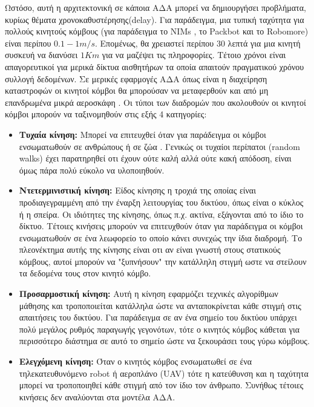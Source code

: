 Ωστόσο, αυτή η αρχιτεκτονική σε κάποια ΑΔΑ μπορεί να δημιουργήσει προβλήματα, κυρίως θέματα χρονοκαθυστέρησης(delay). Για παράδειγμα, μια τυπική ταχύτητα για πολλούς
κινητούς κόμβους (για παράδειγμα το NIMs \cite{nims_mobile}, το Packbot\cite{dynamic_deadlines} και το Robomore\cite{robomore_mobile}) είναι περίπου $0.1-1m/s$.
Επομένως, θα χρειαστεί περίπου 30 λεπτά για μια κινητή συσκευή να διανύσει $1Km$ για να μαζέψει τις πληροφορίες. Τέτοιο χρόνοι είναι απαγορευτικοί για μερικά δίκτυα
αισθητήρων τα οποία απαιτούν πραγματικού χρόνου συλλογή δεδομένων. Σε μερικές εφαρμογές ΑΔΑ όπως είναι η διαχείρηση καταστροφών οι κινητοί κόμβοι θα μπορούσαν να
μεταφερθούν και από μη επανδρωμένα μικρά αεροσκάφη \cite{uav_mobile}. Οι τύποι των διαδρομών που ακολουθούν οι κινητοί κόμβοι μπορούν να ταξινομηθούν στις εξής 4
κατηγορίες:

\begin{itemize}
\item \textbf{Τυχαία κίνηση:} Μπορεί να επιτευχθεί όταν για παράδειγμα οι κόμβοι ενσωματωθούν σε ανθρώπους ή σε ζώα \cite{zebranet}. Γενικώς οι τυχαίοι περίπατοι
(random walks) έχει παρατηρηθεί οτι έχουν ούτε καλή αλλά ούτε κακή απόδοση, είναι όμως πάρα πολύ εύκολο να υλοποιηθούν.

\item \textbf{Ντετερμινιστική κίνηση:} Είδος κίνησης η τροχιά της οποίας είναι προδιαγεγραμμένη από την έναρξη λειτουργίας του δικτύου, όπως είναι ο κύκλος ή η
σπείρα. Οι ιδιότητες της κίνησης, όπως π.χ. ακτίνα, εξάγονται από το ίδιο το δίκτυο. Τέτοιες κινήσεις μπορούν να επιτευχθούν όταν για παράδειγμα οι κόμβοι
ενσωματωθούν σε ένα λεωφορείο το οποίο κάνει συνεχώς την ίδια διαδρομή. Το πλεονέκτημα αυτής της κίνησης είναι οτι αν είναι γνωστή στους στατικούς κόμβους, αυτοί
μπορούν να "ξυπνήσουν" την κατάλληλη στιγμή ωστε να στείλουν τα δεδομένα τους στον κινητό κόμβο.

\item \textbf{Προσαρμοστική κίνηση:} Αυτή η κίνηση εφαρμόζει τεχνικές αλγορίθμων μάθησης και τροποποιείται κατάλληλα ώστε να ανταποκρίνεται κάθε στιγμή στις
απαιτήσεις του δικτύου. Για παράδειγμα σε αν ένα σημείο του δικτύου υπάρχει πολύ μεγάλος ρυθμός παραγωγής γεγονότων, τότε ο κινητός κόμβος κάθεται για περισσότερο
διάστημα σε αυτό το σημείο ώστε να ξεκουράσει τους γύρω κόμβους.

\item \textbf{Ελεγχόμενη κίνηση:} Όταν ο κινητός κόμβος ενσωματωθεί σε ένα τηλεκατευθυνόμενο robot ή αεροπλάνο (UAV) τότε η κατεύθυνση και η ταχύτητα μπορεί να
τροποποιηθεί κάθε στιγμή από τον ίδιο τον άνθρωπο. Συνήθως τέτοιες κινήσεις δεν αναλύονται στα μοντέλα ΑΔΑ.
\end{itemize}



